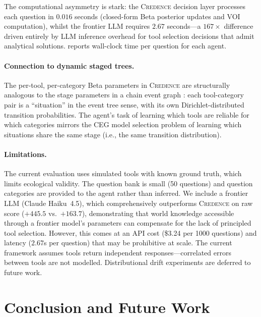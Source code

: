 \documentclass[11pt]{article}
\newcommand{\credence}{\textsc{Credence}}
\begin{document}
The computational asymmetry is stark: the \credence{} decision layer processes each question in $0.016$ seconds (closed-form Beta posterior updates and VOI computation), whilst the frontier LLM requires $2.67$ seconds---a $167\times$ difference driven entirely by LLM inference overhead for tool selection decisions that admit analytical solutions.  reports wall-clock time per question for each agent.

\paragraph{Connection to dynamic staged trees.}
The per-tool, per-category Beta parameters in \credence{} are structurally analogous to the stage parameters in a chain event graph \citep{freeman2011bayesian}: each tool-category pair is a ``situation'' in the event tree sense, with its own Dirichlet-distributed transition probabilities. The agent's task of learning which tools are reliable for which categories mirrors the CEG model selection problem of learning which situations share the same stage (i.e., the same transition distribution).

\paragraph{Limitations.}
The current evaluation uses simulated tools with known ground truth, which limits ecological validity. The question bank is small (50 questions) and question categories are provided to the agent rather than inferred. We include a frontier LLM (Claude Haiku~4.5), which comprehensively outperforms \credence{} on raw score ($+445.5$ vs.\ $+163.7$), demonstrating that world knowledge accessible through a frontier model's parameters can compensate for the lack of principled tool selection. However, this comes at an API cost (\$3.24 per 1000 questions) and latency ($2.67$s per question) that may be prohibitive at scale. The current framework assumes tools return independent responses---correlated errors between tools are not modelled. Distributional drift experiments are deferred to future work.


\section{Conclusion and Future Work}
\label{sec:conclusion}
\end{document}
